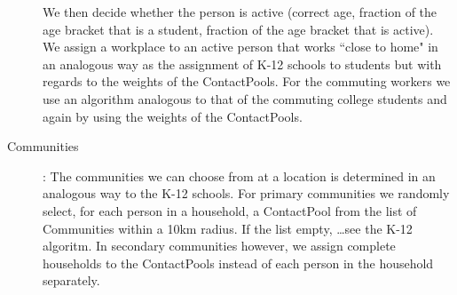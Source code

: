 \begin{description}
        We then decide whether the person is active (correct age, fraction of the age bracket that is a student,
        fraction of the age bracket that is active).
        We assign a workplace to an active person that works ``close to home"  in an 
        analogous way as the assignment of K-12 schools to students but with regards to the weights of the ContactPools.
        For the commuting workers we use an algorithm analogous to that of the commuting college students and again by
        using the weights of the ContactPools.
    \item[Communities]:
        The communities we can choose from at a location is determined in an analogous 
        way to the K-12 schools.
        For primary communities we randomly select, for each person in a household, a ContactPool 
        from the list of Communities within a 10km radius. If the list empty, \ldots see the K-12 algoritm.
        In secondary communities however, we assign complete households to the 
        ContactPools instead of each person in the household separately.
\end{description}
